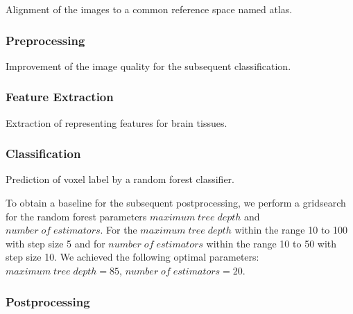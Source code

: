 \documentclass[journal]{IEEEtran}
\begin{document}
Alignment of the images to a common reference space named atlas.

\subsubsection{Preprocessing}

Improvement of the image quality for the subsequent classification.

\subsubsection{Feature Extraction}

Extraction of representing features for brain tissues.

\subsubsection{Classification}

Prediction of voxel label by a random forest classifier.

To obtain a baseline for the subsequent postprocessing, we perform a gridsearch for the random forest parameters $maximum\; tree\; depth$ and $number\; of\; estimators$. For the $maximum\; tree\; depth$ within the range 10 to 100 with step size 5 and for $number\; of\; estimators$ within the range 10 to 50 with step size 10. We achieved the following optimal parameters: $maximum\; tree\; depth = 85$, $number\; of\; estimators = 20$.
\subsubsection{Postprocessing}
\end{document}
